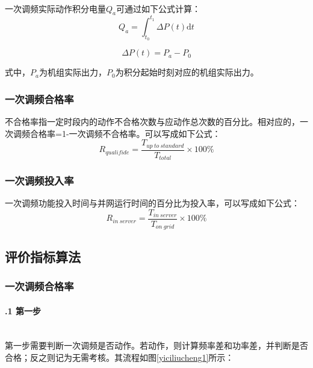 \documentclass[winfonts,UTF8,a4paper]{ctexart}
\newcommand{\upcite}[1]{{\textsuperscript{\cite{#1}}}}
\begin{document}
一次调频实际动作积分电量$ Q_{a} $可通过如下公式计算\upcite{李玺2018水电机组一次调频理论动作积分电量优化算法}：
\begin{equation}\label{yctp4}
	Q_{a}=\int_{t_{0}}^{t_{1}}\Delta P(t) \mathrm{d}t
\end{equation}

\begin{equation}\label{yctp5}
	\Delta P(t)=P_{a}-P_{0}
\end{equation}

式中，$ P_{a} $为机组实际出力，$P_{0}  $为积分起始时刻对应的机组实际出力。
\subsubsection{一次调频合格率}
不合格率指一定时段内的动作不合格次数与应动作总次数的百分比。相对应的，一次调频合格率=1-一次调频不合格率。可以写成如下公式：
\begin{equation}\label{yctphgl}
	R_{qualifide}=\frac{T_{up\ to\ standard}}{T_{total}}\times 100\%
\end{equation}

\subsubsection{一次调频投入率}
一次调频功能投入时间与并网运行时间的百分比为投入率，可以写成如下公式：
\begin{equation}\label{yctptrl}
	R_{in\  server}=\frac{T_{in\  server}}{T_{on\  grid}}\times 100\%
\end{equation}

\subsection{评价指标算法}
\subsubsection{一次调频合格率}
\paragraph{\thesubsubsection.1 第一步}\ \\

第一步需要判断一次调频是否动作。若动作，则计算频率差和功率差，并判断是否合格；反之则记为无需考核。其流程如图\ref{yiciliucheng1}所示：
\end{document}
